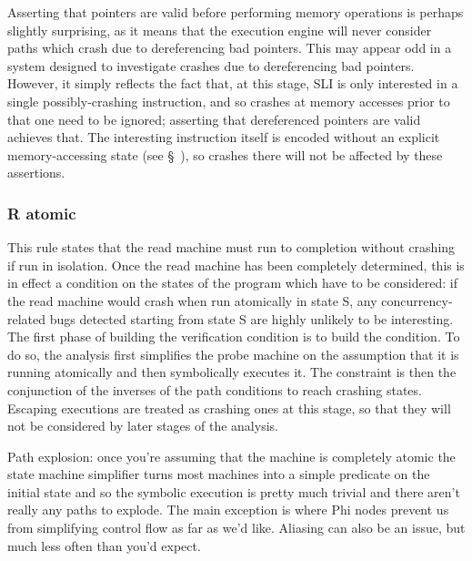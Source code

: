 
Asserting that pointers are valid before performing memory operations is perhaps slightly surprising, as it means that the execution engine will never consider paths which crash due to dereferencing bad pointers.
This may appear odd in a system designed to investigate crashes due to dereferencing bad pointers.
However, it simply reflects the fact that, at this stage, SLI is only interested in a single possibly-crashing instruction, and so crashes at memory accesses prior to that one need to be ignored; asserting that dereferenced pointers are valid achieves that.
The interesting instruction itself is encoded without an explicit memory-accessing state (see \S~), so crashes there will not be affected by these assertions.


\subsubsection{R atomic}

This rule states that the read machine must run to completion without crashing if run in isolation.
Once the read machine has been completely determined, this is in effect a condition on the states of the program which have to be considered: if the read machine would crash when run atomically in state S, any concurrency-related bugs detected starting from state S are highly unlikely to be interesting.
The first phase of building the verification condition is to build the condition.
To do so, the analysis first simplifies the probe machine on the assumption that it is running atomically and then symbolically executes it.
The constraint is then the conjunction of the inverses of the path conditions to reach crashing states.
Escaping executions are treated as crashing ones at this stage, so that they will not be considered by later stages of the analysis.

Path explosion: once you're assuming that the machine is completely atomic the state machine simplifier turns most machines into a simple predicate on the initial state and so the symbolic execution is pretty much trivial and there aren't really any paths to explode.
The main exception is where Phi nodes prevent us from simplifying control flow as far as we'd like.
Aliasing can also be an issue, but much less often than you'd expect.

